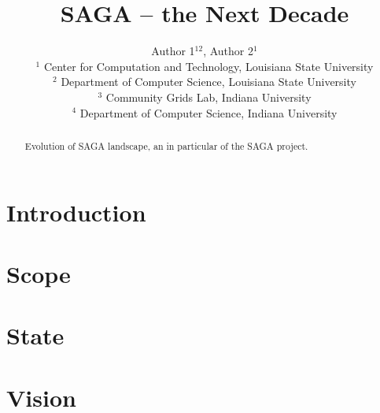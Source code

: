 \documentclass{article}
\begin{document}
\title{\large SAGA -- the Next Decade}

\author{Author 1$^{12}$,
        Author 2$^{1}$\\[1em]
        $^1$ \small
          Center for Computation and Technology, 
          Louisiana State University\\[-0.3em]
        $^2$ \small
          Department of Computer Science, 
          Louisiana State University\\[-0.3em]
        $^3$ \small
          Community Grids Lab, 
          Indiana University\\[-0.3em]
        $^4$ \small
          Department of Computer Science, 
          Indiana University
       }

\maketitle

%
%

\begin{abstract}
 Evolution of SAGA landscape, an in particular of the SAGA project.
\end{abstract}

\section{Introduction}

\section{Scope}
\section{State}
\section{Vision}

\footnotesize



\end{document}
